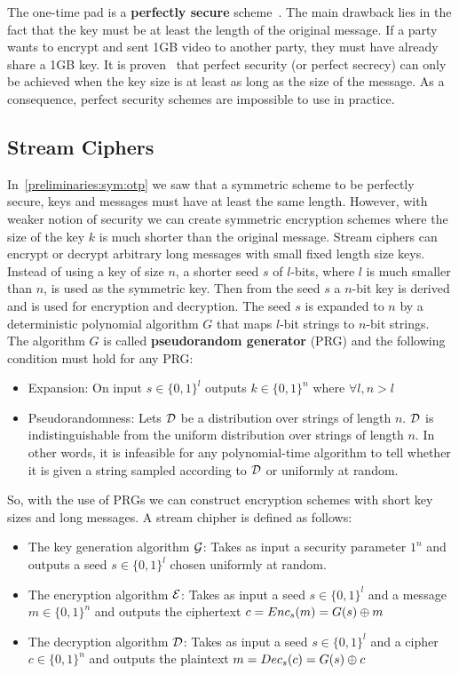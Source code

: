 The one-time pad is a \textbf{perfectly secure} scheme~\cite{kiagias:crypto, boneh_crypto}. The main drawback lies in the fact that the key must be at least the length of the original message. If a party wants to encrypt and sent 1GB video to another party, they must have already share a 1GB key. It is proven~\cite{shannon_otp} that perfect security (or perfect secrecy) can only be achieved when the key size is at least as long as the size of the message. As a consequence, perfect security schemes are impossible to use in practice.

\subsection{Stream Ciphers}
\label{preliminaries:sym:stream}

In~\ref{preliminaries:sym:otp} we saw that a symmetric scheme to be perfectly secure, keys and messages must have at least the same length. However, with weaker notion of security we can create symmetric encryption schemes where the size of the key $k$ is much shorter than the original message. Stream ciphers can encrypt or decrypt arbitrary long messages with small fixed length size keys. Instead of using a key of size $n$, a shorter seed $s$ of $l$-bits, where $l$ is much smaller than $n$, is used as the symmetric key. Then from the seed $s$ a $n$-bit key is derived and is used for encryption and decryption. The seed $s$ is expanded to $n$ by a deterministic polynomial algorithm $G$ that maps $l$-bit strings to $n$-bit strings. The algorithm $G$ is called \textbf{pseudorandom generator} (PRG) and the following condition must hold for any PRG:

\begin{itemize}
  \item Expansion: On input $s \in \{0, 1\}^{l}$ outputs $k \in \{0, 1\}^{n}$ where $\forall l, n > l$
  \item Pseudorandomness: Lets $\mathcal{D}$ be a distribution over strings of length $n$. $\mathcal{D}$ is indistinguishable from the uniform distribution over strings of length $n$. In other words, it is infeasible for any polynomial-time algorithm to tell whether it is given a string sampled according to $\mathcal{D}$ or uniformly at random.
\end{itemize}

So, with the use of PRGs we can construct encryption schemes with short key sizes and long messages. A stream chipher is defined as follows:

\begin{itemize}
  \item The key generation algorithm $\mathcal{G}$: Takes as input a security parameter $1^{n}$ and outputs a seed $s \in \{0, 1\}^{l}$ chosen uniformly at random.
  \item The encryption algorithm $\mathcal{E}$: Takes as input a seed $s \in \{0, 1\}^{l}$ and a message $m \in \{0, 1\}^{n}$ and outputs the ciphertext $c = Enc_s(m) = G(s) \oplus m$
  \item The decryption algorithm $\mathcal{D}$: Takes as input a seed $s \in \{0, 1\}^{l}$ and a cipher $c \in \{0, 1\}^{n}$ and outputs the plaintext $m = Dec_s(c) = G(s) \oplus c$
\end{itemize}

